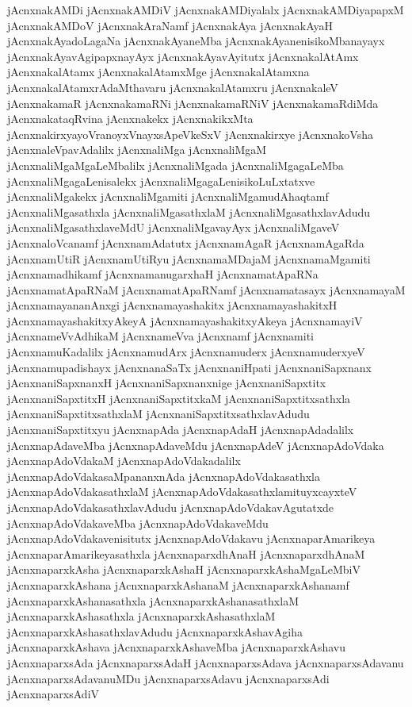 {jAcnxnakAMDi
jAcnxnakAMDiV
jAcnxnakAMDiyalalx
jAcnxnakAMDiyapapxM
jAcnxnakAMDoV
jAcnxnakAraNamf
jAcnxnakAya
jAcnxnakAyaH
jAcnxnakAyadoLagaNa
jAcnxnakAyaneMba
jAcnxnakAyanenisikoMbanayayx
jAcnxnakAyavAgipapxnayAyx
jAcnxnakAyavAyitutx
jAcnxnakalAtAmx
jAcnxnakalAtamx
jAcnxnakalAtamxMge
jAcnxnakalAtamxna
jAcnxnakalAtamxrAdaMthavaru
jAcnxnakalAtamxru
jAcnxnakaleV
jAcnxnakamaR
jAcnxnakamaRNi
jAcnxnakamaRNiV
jAcnxnakamaRdiMda
jAcnxnakataqRvina
jAcnxnakekx
jAcnxnakikxMta
jAcnxnakirxyayoVranoyxVnayxsApeVkeSxV
jAcnxnakirxye
jAcnxnakoVsha
jAcnxnaleVpavAdalilx
jAcnxnaliMga
jAcnxnaliMgaM
jAcnxnaliMgaMgaLeMbalilx
jAcnxnaliMgada
jAcnxnaliMgagaLeMba
jAcnxnaliMgagaLenisalekx
jAcnxnaliMgagaLenisikoLuLxtatxve
jAcnxnaliMgakekx
jAcnxnaliMgamiti
jAcnxnaliMgamudAhaqtamf
jAcnxnaliMgasathxla
jAcnxnaliMgasathxlaM
jAcnxnaliMgasathxlavAdudu
jAcnxnaliMgasathxlaveMdU
jAcnxnaliMgavayAyx
jAcnxnaliMgaveV
jAcnxnaloVcanamf
jAcnxnamAdatutx
jAcnxnamAgaR
jAcnxnamAgaRda
jAcnxnamUtiR
jAcnxnamUtiRyu
jAcnxnamaMDajaM
jAcnxnamaMgamiti
jAcnxnamadhikamf
jAcnxnamanugarxhaH
jAcnxnamatApaRNa
jAcnxnamatApaRNaM
jAcnxnamatApaRNamf
jAcnxnamatasayx
jAcnxnamayaM
jAcnxnamayananAnxgi
jAcnxnamayashakitx
jAcnxnamayashakitxH
jAcnxnamayashakitxyAkeyA
jAcnxnamayashakitxyAkeya
jAcnxnamayiV
jAcnxnameVvAdhikaM
jAcnxnameVva
jAcnxnamf
jAcnxnamiti
jAcnxnamuKadalilx
jAcnxnamudArx
jAcnxnamuderx
jAcnxnamuderxyeV
jAcnxnamupadishayx
jAcnxnanaSaTx
jAcnxnaniHpati
jAcnxnaniSapxnanx
jAcnxnaniSapxnanxH
jAcnxnaniSapxnanxnige
jAcnxnaniSapxtitx
jAcnxnaniSapxtitxH
jAcnxnaniSapxtitxkaM
jAcnxnaniSapxtitxsathxla
jAcnxnaniSapxtitxsathxlaM
jAcnxnaniSapxtitxsathxlavAdudu
jAcnxnaniSapxtitxyu
jAcnxnapAda
jAcnxnapAdaH
jAcnxnapAdadalilx
jAcnxnapAdaveMba
jAcnxnapAdaveMdu
jAcnxnapAdeV
jAcnxnapAdoVdaka
jAcnxnapAdoVdakaM
jAcnxnapAdoVdakadalilx
jAcnxnapAdoVdakasaMpananxnAda
jAcnxnapAdoVdakasathxla
jAcnxnapAdoVdakasathxlaM
jAcnxnapAdoVdakasathxlamituyxcayxteV
jAcnxnapAdoVdakasathxlavAdudu
jAcnxnapAdoVdakavAgutatxde
jAcnxnapAdoVdakaveMba
jAcnxnapAdoVdakaveMdu
jAcnxnapAdoVdakavenisitutx
jAcnxnapAdoVdakavu
jAcnxnaparAmarikeya
jAcnxnaparAmarikeyasathxla
jAcnxnaparxdhAnaH
jAcnxnaparxdhAnaM
jAcnxnaparxkAsha
jAcnxnaparxkAshaH
jAcnxnaparxkAshaMgaLeMbiV
jAcnxnaparxkAshana
jAcnxnaparxkAshanaM
jAcnxnaparxkAshanamf
jAcnxnaparxkAshanasathxla
jAcnxnaparxkAshanasathxlaM
jAcnxnaparxkAshasathxla
jAcnxnaparxkAshasathxlaM
jAcnxnaparxkAshasathxlavAdudu
jAcnxnaparxkAshavAgiha
jAcnxnaparxkAshava
jAcnxnaparxkAshaveMba
jAcnxnaparxkAshavu
jAcnxnaparxsAda
jAcnxnaparxsAdaH
jAcnxnaparxsAdava
jAcnxnaparxsAdavanu
jAcnxnaparxsAdavanuMDu
jAcnxnaparxsAdavu
jAcnxnaparxsAdi
jAcnxnaparxsAdiV
}
